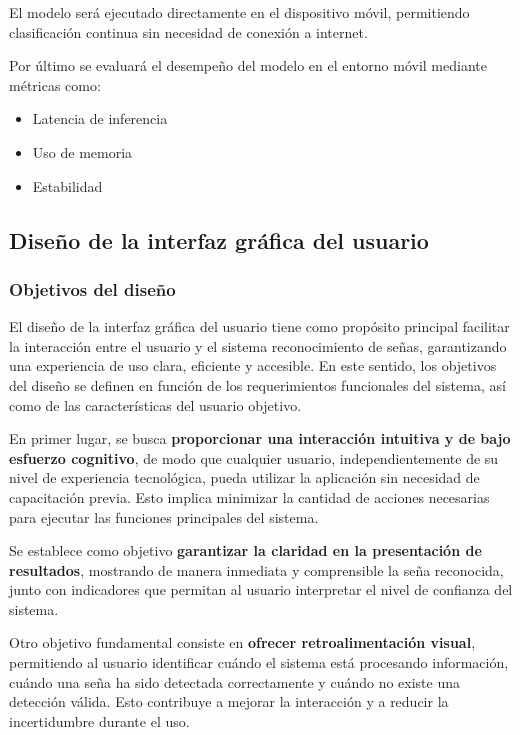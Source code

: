 	El modelo será ejecutado directamente en el dispositivo móvil, permitiendo clasificación continua sin necesidad de conexión a internet.
	
	Por último se evaluará el desempeño del modelo en el entorno móvil mediante métricas como:
	
	\begin{itemize}
		\item Latencia de inferencia
		\item Uso de memoria
		\item Estabilidad
	\end{itemize}
	
	\subsection{Diseño de la interfaz gráfica del usuario}
	
	\subsubsection{Objetivos del diseño}
	
	El diseño de la interfaz gráfica del usuario tiene como propósito 
	principal facilitar la interacción entre el usuario y el sistema reconocimiento de señas, garantizando una experiencia de uso clara, eficiente y accesible. En este sentido, los objetivos del diseño se definen en función de los requerimientos funcionales del sistema, así como de las características del usuario objetivo.
	
	En primer lugar, se busca \textbf{proporcionar una interacción intuitiva 
	y de bajo esfuerzo cognitivo}, de modo que cualquier usuario, independientemente de su nivel de experiencia tecnológica, pueda utilizar la aplicación sin necesidad de capacitación previa. Esto implica minimizar la cantidad de acciones necesarias para ejecutar las funciones principales del sistema.
	
	Se establece como objetivo \textbf{garantizar la claridad en la 
	presentación de resultados}, mostrando de manera inmediata y comprensible la seña reconocida, junto con indicadores que permitan al usuario interpretar el nivel de confianza del sistema.
	
	Otro objetivo fundamental consiste en \textbf{ofrecer retroalimentación 
	visual}, permitiendo al usuario identificar cuándo el sistema está procesando información, cuándo una seña ha sido detectada correctamente y cuándo no existe una detección válida. Esto contribuye a mejorar la interacción y a reducir la incertidumbre durante el uso.
	
